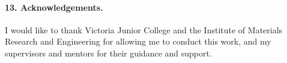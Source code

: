 \documentclass[a4paper,12pt]{article}
\begin{document}
\paragraph{13. Acknowledgements.}I would like to thank Victoria Junior College and the Institute of Materials Research and Engineering for allowing me to conduct this work, and my supervisors and mentors for their guidance and support.



		
	 
\end{document}
